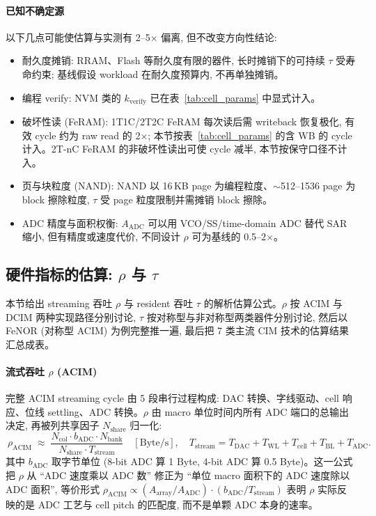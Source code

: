\paragraph{已知不确定源}
以下几点可能使估算与实测有 2--5$\times$ 偏离, 但不改变方向性结论:
\begin{itemize}[topsep=2pt, itemsep=1pt]
    \item 耐久度摊销: RRAM、Flash 等耐久度有限的器件, 长时摊销下的可持续 $\tau$ 受寿命约束; 基线假设 workload 在耐久度预算内, 不再单独摊销。
    \item 编程 verify: NVM 类的 $k_{\mathrm{verify}}$ 已在表~\ref{tab:cell_params} 中显式计入。
    \item 破坏性读 (FeRAM): 1T1C/2T2C FeRAM 每次读后需 writeback 恢复极化, 有效 cycle 约为 raw read 的 2$\times$; 本节按表~\ref{tab:cell_params} 的含 WB 的 cycle 计入。2T-nC FeRAM 的非破坏性读出可使 cycle 减半, 本节按保守口径不计入。
    \item 页与块粒度 (NAND): NAND 以 16\,KB page 为编程粒度、$\sim$512--1536 page 为 block 擦除粒度, $\tau$ 受 page 粒度限制并需摊销 block 擦除。
    \item ADC 精度与面积权衡: $A_{\mathrm{ADC}}$ 可以用 VCO/SS/time-domain ADC 替代 SAR 缩小, 但有精度或速度代价, 不同设计 $\rho$ 可为基线的 0.5--2$\times$。
\end{itemize}

\subsection{硬件指标的估算: $\rho$ 与 $\tau$}
\label{sec:hw_quant}

本节给出 streaming 吞吐 $\rho$ 与 resident 吞吐 $\tau$ 的解析估算公式。$\rho$ 按 ACIM 与 DCIM 两种实现路径分别讨论, $\tau$ 按对称型与非对称型两类器件分别讨论, 然后以 FeNOR (对称型 ACIM) 为例完整推一遍, 最后把 7 类主流 CIM 技术的估算结果汇总成表。

\paragraph{流式吞吐 $\rho$ (ACIM)}
完整 ACIM streaming cycle 由 5 段串行过程构成: DAC 转换、字线驱动、cell 响应、位线 settling、ADC 转换。$\rho$ 由 macro 单位时间内所有 ADC 端口的总输出决定, 再被列共享因子 $N_{\mathrm{share}}$ 归一化:
\begin{equation}
\boxed{\ \rho_{\mathrm{ACIM}} \;\approx\; \frac{N_{\mathrm{col}} \cdot b_{\mathrm{ADC}} \cdot N_{\mathrm{bank}}}{N_{\mathrm{share}} \cdot T_{\mathrm{stream}}} \quad [\mathrm{Byte}/\mathrm{s}], \quad T_{\mathrm{stream}} = T_{\mathrm{DAC}} + T_{\mathrm{WL}} + T_{\mathrm{cell}} + T_{\mathrm{BL}} + T_{\mathrm{ADC}}.\ }
\label{eq:rho_acim}
\end{equation}
其中 $b_{\mathrm{ADC}}$ 取字节单位 (8-bit ADC 算 1 Byte, 4-bit ADC 算 0.5 Byte)。这一公式把 $\rho$ 从 “ADC 速度乘以 ADC 数” 修正为 “单位 macro 面积下的 ADC 速度除以 ADC 面积”, 等价形式 $\rho_{\mathrm{ACIM}} \propto (A_{\mathrm{array}}/A_{\mathrm{ADC}}) \cdot (b_{\mathrm{ADC}}/T_{\mathrm{stream}})$ 表明 $\rho$ 实际反映的是 ADC 工艺与 cell pitch 的匹配度, 而不是单颗 ADC 本身的速率。

